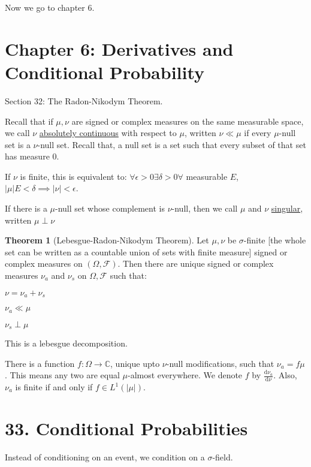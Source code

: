 \documentclass{article}
\theoremstyle{definition}
\newtheorem{theorem}{Theorem}
\begin{document}
Now we go to chapter 6.

\section*{Chapter 6: Derivatives and Conditional Probability}

Section 32: The Radon-Nikodym Theorem.


Recall that if \(\mu ,\nu \) are signed or complex measures on the same measurable space, we call \(\nu\) \underline{absolutely continuous} with respect to \(\mu\), written \(\nu \ll \mu\) if every \(\mu\)-null set is a \(\nu\)-null set. Recall that, a null set is a set such that every subset of that set has measure \(0\).

If \(\nu\) is finite, this is equivalent to: \(\forall \epsilon >0 \exists \delta >0 \forall \) measurable \(E\), \(\vert \mu  \vert E < \delta \implies \vert \nu  \vert < \epsilon\).

If there is a \(\mu\)-null set whose complement is \(\nu\)-null, then we call \(\mu \) and \(\nu \) \underline{singular}, written \(\mu \perp \nu\)

\begin{theorem}
    [Lebesgue-Radon-Nikodym Theorem]

    Let \(\mu ,\nu \) be \(\sigma\)-finite [the whole set can be written as a countable union of sets with finite measure] signed or complex measures on \((\Omega , \mathcal{F})\). Then there are unique signed or complex measures \(\nu_a\) and \(\nu_s\) on \(\Omega , \mathcal{F}\) such that:

    \(\nu = \nu_a + \nu_s\) 

    \(\nu_a \ll \mu\) 

    \(\nu_s \perp \mu\) 

    This is a lebesgue decomposition.

    There is a function \(f: \Omega \to \mathbb{C}\), unique upto \(\nu\)-null modifications, such that \(\nu_a = f \mu\). This means any two are equal \(\mu\)-almost everywhere. We denote \(f\) by \(\frac{\mathrm{d}\nu_a}{\mathrm{d}\nu} \). Also, \(\nu_a\) is finite if and only if \(f\in L^1(\vert \mu \vert )\).
\end{theorem}

\section*{33. Conditional Probabilities}

Instead of conditioning on an event, we condition on a \(\sigma\)-field.
\end{document}

